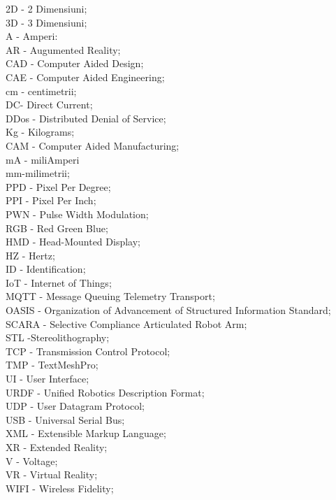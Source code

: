 \documentclass[a4paper,12pt]{report}
\begin{document}
\noindent 
2D - 2 Dimensiuni;\\
3D - 3 Dimensiuni; \\
A - Amperi:\\
AR - Augumented Reality;\\
CAD - Computer Aided Design;\\
CAE - Computer Aided Engineering;\\
cm - centimetrii;\\
DC- Direct Current;\\
DDos - Distributed Denial of Service;\\
Kg - Kilograms;\\
CAM - Computer Aided Manufacturing;\\
mA - miliAmperi\\
mm-milimetrii;\\
PPD - Pixel Per Degree;\\
PPI - Pixel Per Inch;\\
PWN - Pulse Width Modulation;\\
RGB - Red Green Blue;\\
HMD - Head-Mounted Display; \\
HZ - Hertz;\\
ID - Identification;\\
IoT - Internet of Things;\\
MQTT - Message Queuing Telemetry Transport;\\
OASIS - Organization of Advancement of Structured Information Standard;\\
SCARA - Selective Compliance Articulated Robot Arm;\\
STL -Stereolithography;\\
TCP - Transmission Control Protocol;\\
TMP - TextMeshPro;\\
UI - User Interface;\\
URDF - Unified Robotics Description Format;\\
UDP - User Datagram Protocol;\\
USB - Universal Serial Bus;\\
XML - Extensible Markup Language;\\
XR - Extended Reality;\\
V  - Voltage;\\
VR - Virtual Reality;\\
WIFI - Wireless Fidelity;\\
\end{document}
